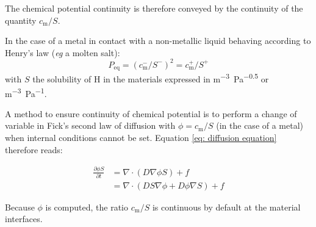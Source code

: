 The chemical potential continuity is therefore conveyed by the continuity of the quantity $c_\mathrm{m}/S$.

In the case of a metal in contact with a non-metallic liquid behaving according to Henry's law (\textit{eg} a molten salt):
\begin{equation}
    P_\mathrm{eq} = (c_\mathrm{m}^-/S^-)^2 = c_\mathrm{m}^+/S^+
\end{equation}
with $S$ the solubility of H in the materials expressed in \si{m^{-3}.Pa^{-0.5}} or \si{m^{-3}.Pa^{-1}}.




A method to ensure continuity of chemical potential is to perform a change of variable in Fick's second law of diffusion with $\phi = c_\mathrm{m}/S$ (in the case of a metal)  when internal conditions cannot be set.
Equation \ref{eq: diffusion equation} therefore reads:

\begin{align}
    \frac{\partial \phi S}{\partial t} &= \nabla \cdot\left(D \nabla \phi S\right) + f \nonumber \\
    &=\nabla \cdot\left( D S \nabla \phi + D \phi \nabla S\right) + f \label{eq: diffusion equation changed}
\end{align}

Because $\phi$ is computed, the ratio $c_\mathrm{m}/S$ is continuous by default at the material interfaces.



